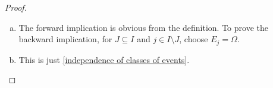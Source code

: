 \begin{proof}
    ~
    \begin{enumerate}[(a)]
        \item The forward implication is obvious from the definition. To prove the backward implication, for $J\subseteq I$ and $j\in I\setminus J$, choose $E_j=\Omega$.
        
        \item This is just \ref{independence of classes of events}.
        
        
        
    
        
    
    \end{enumerate}
\end{proof}
